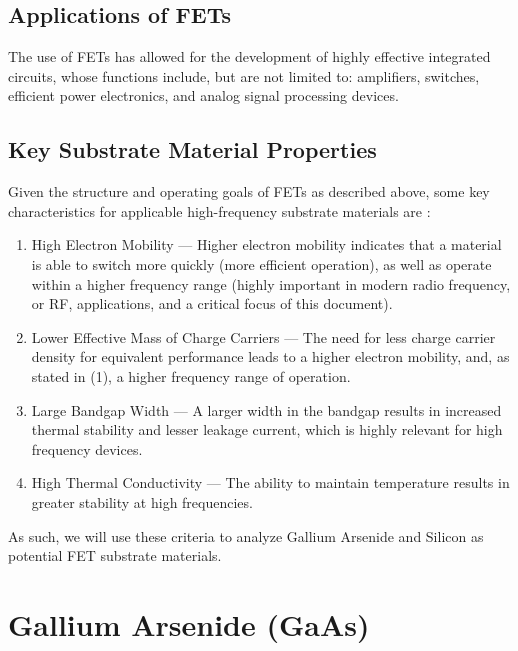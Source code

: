 \documentclass[conference]{IEEEtran}
\begin{document}
\subsection{Applications of FETs}

The use of FETs has allowed for the development of highly effective integrated circuits, whose functions include, but are not limited to: amplifiers, switches, efficient power electronics, and analog signal processing devices.

\subsection{Key Substrate Material Properties}\label{props}

Given the structure and operating goals of FETs as described above, some key characteristics for applicable high-frequency substrate materials are \cite{young}:

\begin{enumerate}

  \item High Electron Mobility — Higher electron mobility indicates that a material is able to switch more quickly (more efficient operation), as well as operate within a higher frequency range (highly important in modern radio frequency, or RF, applications, and a critical focus of this document).

  \item Lower Effective Mass of Charge Carriers — The need for less charge carrier density for equivalent performance leads to a higher electron mobility, and, as stated in (1), a higher frequency range of operation.

  \item Large Bandgap Width — A larger width in the bandgap results in increased thermal stability and lesser leakage current, which is highly relevant for high frequency devices.

  \item High Thermal Conductivity — The ability to maintain temperature results in greater stability at high frequencies.

\end{enumerate}

As such, we will use these criteria to analyze Gallium Arsenide and Silicon as potential FET substrate materials.

\section{Gallium Arsenide (GaAs)}
\end{document}
